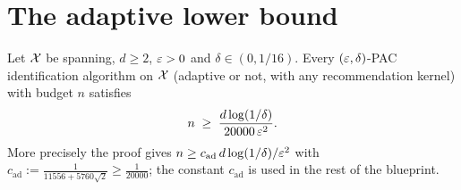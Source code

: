 \section{The adaptive lower bound}
\label{sec:lower_adaptive_theorem}

\begin{theorem}\label{thm:lower_adaptive}
\leanok
{}
Let $\mathcal{X}$ be spanning, $d \ge 2$, $\varepsilon > 0$ and $\delta \in (0, 1/16)$. Every $(\varepsilon,\delta)$-PAC identification
algorithm on $\mathcal{X}$ (adaptive or not, with any recommendation kernel) with budget $n$
satisfies
\[
  n \;\ge\; \frac{d\log(1/\delta)}{20000\,\varepsilon^2} .
\]
More precisely the proof gives $n \ge c_{\mathrm{ad}}\, d\log(1/\delta)/\varepsilon^2$ with
$c_{\mathrm{ad}} := \frac{1}{11556 + 5760\sqrt2} \ge \frac{1}{20000}$; the constant
$c_{\mathrm{ad}}$ is used in the rest of the blueprint.
\end{theorem}

